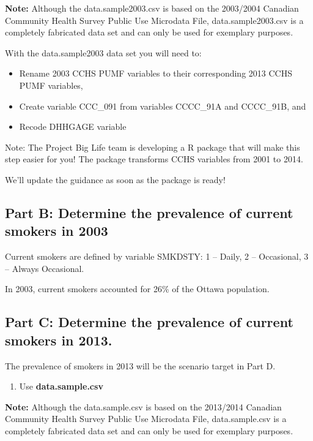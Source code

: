 \documentclass[]{book}
\providecommand{\tightlist}{%
  \setlength{\itemsep}{0pt}\setlength{\parskip}{0pt}}
\begin{document}
\textbf{Note:} Although the data.sample2003.csv is based on the
2003/2004 Canadian Community Health Survey Public Use Microdata File,
data.sample2003.csv is a completely fabricated data set and can only be
used for exemplary purposes.

With the data.sample2003 data set you will need to:

\begin{itemize}
\item
  Rename 2003 CCHS PUMF variables to their corresponding 2013 CCHS PUMF
  variables,
\item
  Create variable CCC\_091 from variables CCCC\_91A and CCCC\_91B, and
\item
  Recode DHHGAGE variable
\end{itemize}

Note: The Project Big Life team is developing a R package that will make
this step easier for you! The package transforms CCHS variables from
2001 to 2014.

We'll update the guidance as soon as the package is ready!

\subsection{Part B: Determine the prevalence of current smokers in
2003}\label{part-b-determine-the-prevalence-of-current-smokers-in-2003}

Current smokers are defined by variable SMKDSTY: 1 -- Daily, 2 --
Occasional, 3 -- Always Occasional.

In 2003, current smokers accounted for 26\% of the Ottawa population.

\subsection{Part C: Determine the prevalence of current smokers in
2013.}\label{part-c-determine-the-prevalence-of-current-smokers-in-2013.}

The prevalence of smokers in 2013 will be the scenario target in Part D.

\begin{enumerate}
\def\labelenumi{\arabic{enumi}.}
\tightlist
\item
  Use \textbf{data.sample.csv}
\end{enumerate}

\textbf{Note:} Although the data.sample.csv is based on the 2013/2014
Canadian Community Health Survey Public Use Microdata File,
data.sample.csv is a completely fabricated data set and can only be used
for exemplary purposes.
\end{document}
